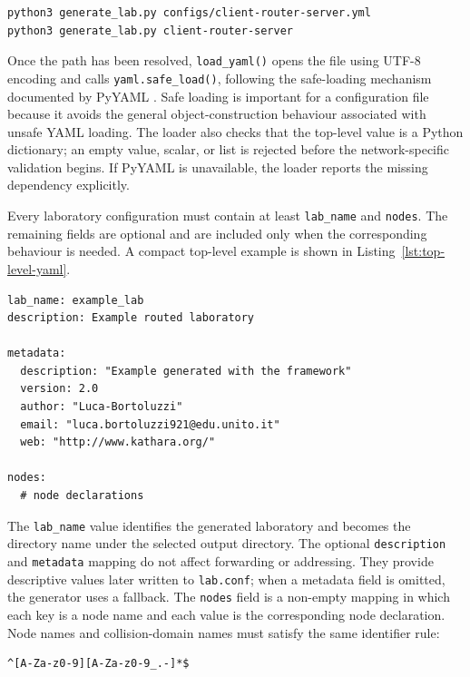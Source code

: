 \begin{lstlisting}[language=bash,caption={Equivalent ways of selecting a configuration.},label={lst:config-resolution}]
python3 generate_lab.py configs/client-router-server.yml
python3 generate_lab.py client-router-server
\end{lstlisting}

Once the path has been resolved, \texttt{load\_yaml()} opens the file using
UTF-8 encoding and calls \texttt{yaml.safe\_load()}, following the safe-loading
mechanism documented by PyYAML \cite{pyyaml_docs}. Safe loading is important
for a configuration file because it avoids the general object-construction
behaviour associated with unsafe YAML loading. The loader also checks that the top-level value is a
Python dictionary; an empty value, scalar, or list is rejected before the
network-specific validation begins. If PyYAML is unavailable, the loader
reports the missing dependency explicitly.

Every laboratory configuration must contain at least \texttt{lab\_name} and
\texttt{nodes}. The remaining fields are optional and are included only when
the corresponding behaviour is needed. A compact top-level example is shown
in Listing~\ref{lst:top-level-yaml}.

\begin{lstlisting}[caption={General top-level structure of a laboratory configuration.},label={lst:top-level-yaml}]
lab_name: example_lab
description: Example routed laboratory

metadata:
  description: "Example generated with the framework"
  version: 2.0
  author: "Luca-Bortoluzzi"
  email: "luca.bortoluzzi921@edu.unito.it"
  web: "http://www.kathara.org/"

nodes:
  # node declarations
\end{lstlisting}

The \texttt{lab\_name} value identifies the generated laboratory and becomes
the directory name under the selected output directory. The optional
\texttt{description} and \texttt{metadata} mapping do not affect forwarding or
addressing. They provide descriptive values later written to
\texttt{lab.conf}; when a metadata field is omitted, the generator uses a
fallback. The \texttt{nodes} field is a non-empty mapping in which each key is
a node name and each value is the corresponding node declaration. Node names
and collision-domain names must satisfy the same identifier rule:

\begin{lstlisting}[caption={Identifier pattern accepted for nodes and collision domains.},label={lst:name-pattern}]
^[A-Za-z0-9][A-Za-z0-9_.-]*$
\end{lstlisting}

